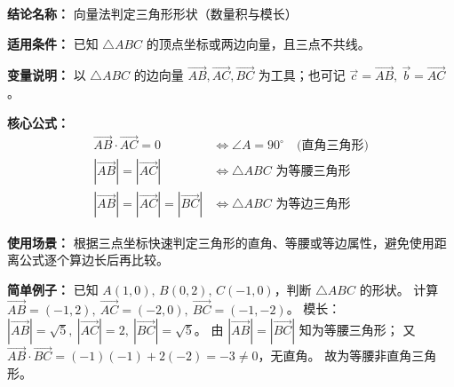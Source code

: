 \textbf{结论名称：} 向量法判定三角形形状（数量积与模长）

\textbf{适用条件：} 已知 \(\triangle ABC\) 的顶点坐标或两边向量，且三点不共线。

\textbf{变量说明：} 以 \(\triangle ABC\) 的边向量 \(\overrightarrow{AB},\overrightarrow{AC},\overrightarrow{BC}\) 为工具；也可记 \(\vec{c}=\overrightarrow{AB},\ \vec{b}=\overrightarrow{AC}\)。

\textbf{核心公式：}
\[
\boxed{
\begin{aligned}
\overrightarrow{AB}\cdot\overrightarrow{AC}=0 &\iff \angle A = 90^\circ \quad\text{(直角三角形)}\\[2pt]
|\overrightarrow{AB}|=|\overrightarrow{AC}| &\iff \triangle ABC\text{ 为等腰三角形}\\[2pt]
|\overrightarrow{AB}|=|\overrightarrow{AC}|=|\overrightarrow{BC}| &\iff \triangle ABC\text{ 为等边三角形}
\end{aligned}
}
\]

\textbf{使用场景：} 根据三点坐标快速判定三角形的直角、等腰或等边属性，避免使用距离公式逐个算边长后再比较。

\textbf{简单例子：} 已知 \(A(1,0),\,B(0,2),\,C(-1,0)\)，判断 \(\triangle ABC\) 的形状。  
计算 \(\overrightarrow{AB}=(-1,2),\ \overrightarrow{AC}=(-2,0),\ \overrightarrow{BC}=(-1,-2)\)。  
模长：\(|\overrightarrow{AB}|=\sqrt{5},\ |\overrightarrow{AC}|=2,\ |\overrightarrow{BC}|=\sqrt{5}\)。  
由 \(|\overrightarrow{AB}|=|\overrightarrow{BC}|\) 知为等腰三角形；  
又 \(\overrightarrow{AB}\cdot\overrightarrow{BC}=(-1)(-1)+2(-2)=-3\neq0\)，无直角。  
故为等腰非直角三角形。